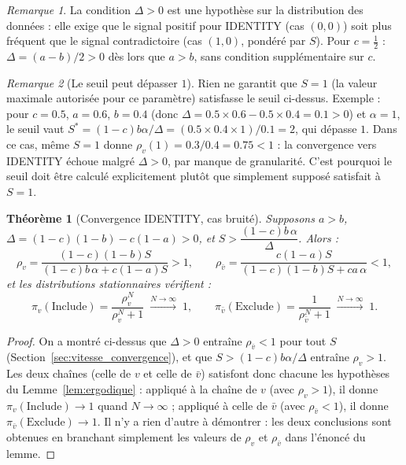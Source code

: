 \documentclass[12pt,a4paper]{article}
\newtheorem{theorem}{Théorème}[section]
\theoremstyle{remark}
\newtheorem{remark}{Remarque}[section]
\newcommand{\Inc}{\ensuremath{\mathrm{Include}}}
\newcommand{\Exc}{\ensuremath{\mathrm{Exclude}}}
\newcommand{\vbar}{\bar{v}}
\begin{document}
\begin{remark}
La condition $\Delta > 0$ est une hypothèse sur la distribution des données : elle exige que
le signal positif pour IDENTITY (cas $(0,0)$) soit plus fréquent que le signal contradictoire
(cas $(1,0)$, pondéré par $S$).
Pour $c = \tfrac{1}{2}$ : $\Delta = (a-b)/2 > 0$ dès lors que $a > b$,
sans condition supplémentaire sur $c$.
\end{remark}

\begin{remark}[Le seuil peut dépasser $1$]
Rien ne garantit que $S=1$ (la valeur maximale autorisée pour ce paramètre) satisfasse
le seuil ci-dessus. Exemple : pour $c=0.5$, $a=0.6$, $b=0.4$ (donc
$\Delta=0.5\times0.6-0.5\times0.4=0.1>0$) et $\alpha=1$, le seuil vaut
$S^*=(1-c)b\alpha/\Delta = (0.5\times0.4\times1)/0.1 = 2$, qui dépasse $1$. Dans ce
cas, même $S=1$ donne $\rho_v(1) = 0.3/0.4 = 0.75 < 1$ : la convergence vers IDENTITY
échoue malgré $\Delta>0$, par manque de granularité. C'est pourquoi le seuil doit être
calculé explicitement plutôt que simplement supposé satisfait à $S=1$.
\end{remark}

\begin{theorem}[Convergence IDENTITY, cas bruité]\label{thm:identity_bruit}
Supposons $a > b$, $\Delta = (1-c)(1-b)-c(1-a) > 0$, et
$S > \dfrac{(1-c)b\,\alpha}{\Delta}$.  Alors :
\[
  \rho_v = \frac{(1-c)(1-b)S}{(1-c)b\,\alpha+c(1-a)S} > 1,
  \qquad
  \rho_{\vbar} = \frac{c(1-a)S}{(1-c)(1-b)S+ca\,\alpha} < 1,
\]
et les distributions stationnaires vérifient :
\[
  \pi_v(\Inc) = \frac{\rho_v^N}{\rho_v^N+1} \;\xrightarrow{N\to\infty}\; 1,
  \qquad
  \pi_{\vbar}(\Exc) = \frac{1}{\rho_{\vbar}^N+1} \;\xrightarrow{N\to\infty}\; 1.
\]
\end{theorem}

\begin{proof}
On a montré ci-dessus que $\Delta>0$ entraîne $\rho_{\vbar}<1$ pour tout $S$
(Section~\ref{sec:vitesse_convergence}), et que $S>(1-c)b\alpha/\Delta$ entraîne
$\rho_v>1$. Les deux chaînes (celle de $v$ et celle de $\vbar$) satisfont donc chacune
les hypothèses du Lemme~\ref{lem:ergodique} : appliqué à la chaîne de $v$ (avec
$\rho_v>1$), il donne $\pi_v(\Inc)\to1$ quand $N\to\infty$ ; appliqué à celle de
$\vbar$ (avec $\rho_{\vbar}<1$), il donne $\pi_{\vbar}(\Exc)\to1$. Il n'y a rien
d'autre à démontrer : les deux conclusions sont obtenues en branchant simplement les
valeurs de $\rho_v$ et $\rho_{\vbar}$ dans l'énoncé du lemme.
\end{proof}
\end{document}
